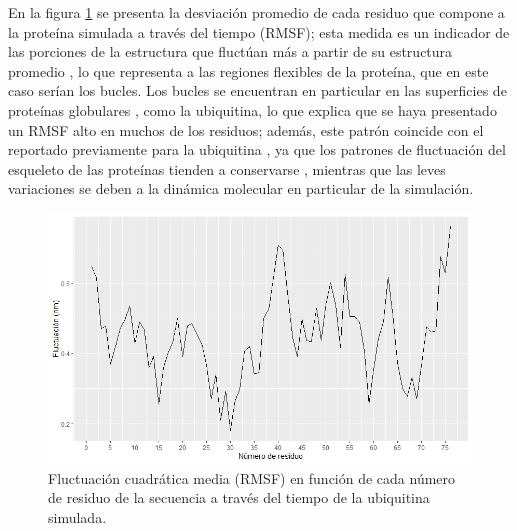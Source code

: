\documentclass[3pt,twocolumn]{elsarticle}
\begin{document}
En la figura \ref{rmsf} se presenta la desviación promedio de cada residuo que compone a la proteína simulada a través del tiempo (RMSF); esta medida es un indicador de las porciones de la estructura que fluctúan más a partir de su estructura promedio \cite{fluctuacion}, lo que representa a las regiones flexibles de la proteína, que en este caso serían los bucles. Los bucles se encuentran en particular en las superficies de proteínas globulares \cite{loops}, como la ubiquitina, lo que explica que se haya presentado un RMSF alto en muchos de los residuos; además, este patrón coincide con el reportado previamente para la ubiquitina \cite{simuubq}, ya que los patrones de fluctuación del esqueleto de las proteínas tienden a conservarse \cite{conserva}, mientras que las leves variaciones se deben a la dinámica molecular en particular de la simulación.

\begin{figure}[ptb]
\begin{center}
\includegraphics[width=\linewidth]{rmsf.png}
\end{center}
\caption{Fluctuación cuadrática media (RMSF) en función de cada número de residuo de la secuencia a través del tiempo de la ubiquitina simulada.\label{rmsf}}
\end{figure}
\end{document}

